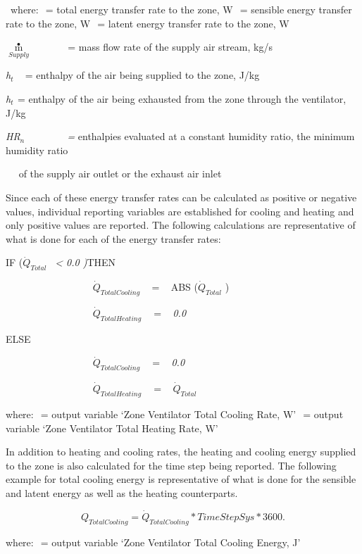 ~where: \(_{ }\) = total energy transfer rate to the zone, W \(_{ }\) = sensible energy transfer rate to the zone, W \(_{ }\) = latent energy transfer rate to the zone, W

\({\mathop m\limits^ \bullet_{Supply}}\) ~~~~~~ = mass flow rate of the supply air stream, kg/s

\emph{h\(_{t}\)} ~ = enthalpy of the air being supplied to the zone, J/kg

\emph{h\(_{t}\)}\(_{ }\) = enthalpy of the air being exhausted from the zone through the ventilator, J/kg

\emph{HR\(_{n}\)~~~~~ ~~ =} enthalpies evaluated at a constant humidity ratio, the minimum humidity ratio

~~ of the supply air outlet or the exhaust air inlet

Since each of these energy transfer rates can be calculated as positive or negative values, individual reporting variables are established for cooling and heating and only positive values are reported. The following calculations are representative of what is done for each of the energy transfer rates:

IF (\({\dot Q_{Total}}\) \emph{~\textless{} 0.0 )}THEN

~~~~~~~~~~~~~~~~~ \({\dot Q_{TotalCooling}}\) ~ = ~ ABS (\({\dot Q_{Total}}\) )

~~~~~~~~~~~~~~~~~ \({\dot Q_{TotalHeating}}\) \(_{ }\)~ = ~ \emph{0.0}

ELSE

~~~~~~~~~~~~~~~~~ \({\dot Q_{TotalCooling}}\) \(_{ }\)~ = ~ \emph{0.0}

~~~~~~~~~~~~~~~~~ \({\dot Q_{TotalHeating}}\) \(_{ }\)~ = ~ \({\dot Q_{Total}}\)

where: \(_{ }\) = output variable `Zone Ventilator Total Cooling Rate, W' \(_{ }\) = output variable `Zone Ventilator Total Heating Rate, W'

In addition to heating and cooling rates, the heating and cooling energy supplied to the zone is also calculated for the time step being reported. The following example for total cooling energy is representative of what is done for the sensible and latent energy as well as the heating counterparts.

\begin{equation}
{Q_{TotalCooling}} = {\dot Q_{TotalCooling}}*TimeStepSys*3600.
\end{equation}

where: \(_{ }\) = output variable `Zone Ventilator Total Cooling Energy, J'

